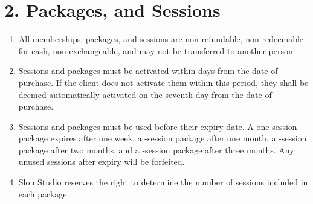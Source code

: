 \documentclass[12pt,a4paper]{article}
\newcommand{\engnum}[1]{\textLR{#1}}
\begin{document}
\section*{2. Packages, and Sessions}
\begin{enumerate}
    \item All memberships, packages, and sessions are non-refundable, non-redeemable for cash, non-exchangeable, and may not be transferred to another person.
    \item Sessions and packages must be activated within \engnum{7} days from the date of purchase. If the client does not activate them within this period, they shall be deemed automatically activated on the seventh day from the date of purchase.
    \item Sessions and packages must be used before their expiry date. A one-session package expires after one week, a \engnum{5}-session package after one month, a \engnum{10}-session package after two months, and a \engnum{20}-session package after three months. Any unused sessions after expiry will be forfeited.
    \item Slou Studio reserves the right to determine the number of sessions included in each package.
\end{enumerate}
\end{document}
